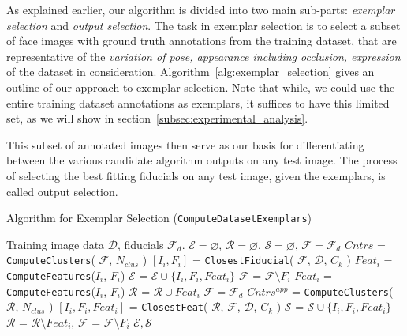 \label{subsec:algorithm_outline}
As explained earlier, our algorithm is divided into two main sub-parts: \emph{exemplar selection}
and \emph{output selection}.
The task in exemplar selection 
is to select a subset of face images with ground truth annotations from the training dataset, 
that are representative of the \emph{variation of pose, appearance including occlusion, expression}
\etc of the dataset in consideration. Algorithm~\ref{alg:exemplar_selection} gives an outline
of our approach to exemplar selection. Note that while, we could use the entire training dataset
annotations as exemplars, it suffices to have this limited set, as we will show in
section~\ref{subsec:experimental_analysis}.

This subset of annotated images then serve as our basis for differentiating between
the various candidate algorithm outputs on any test image. The process of selecting 
the best fitting fiducials on any test image, given the exemplars, is called
output selection.

 \begin{algorithm}[!h]
  \caption{Algorithm for Exemplar Selection ({\tt ComputeDatasetExemplars})}
\begin{algorithmic}
  \INPUT Training image data $\mathcal{D}$, fiducials $\mathcal{F}_d$.
  \STATE $\mathcal{E} = \varnothing$, $\mathcal{R} = \varnothing$, $\mathcal{S} = \varnothing$, $\mathcal{F} = \mathcal{F}_d$
  \STATE $Cntrs$ = {\tt ComputeClusters}( $\mathcal{F}$, $N_{clus}$ )
    \STATE $[ I_i, F_i ]$ = {\tt ClosestFiducial}( $\mathcal{F}$, $\mathcal{D}$, $C_k$ )
    \STATE $Feat_i$ = {\tt ComputeFeatures}($I_i$, $F_i$)
    \STATE $\mathcal{E}$ = $\mathcal{E} \cup \{I_i, F_i, Feat_i\}$
    \STATE $\mathcal{F}$ = $\mathcal{F} \setminus F_i$
  \ENDFOR
    \STATE $Feat_i$ = {\tt ComputeFeatures}($I_i$, $F_i$)
    \STATE $\mathcal{R}$ = $\mathcal{R} \cup  Feat_i $
  \ENDFOR
  \STATE $\mathcal{F} = \mathcal{F}_d$
  \STATE $Cntrs^{app}$ = {\tt ComputeClusters}( $\mathcal{R}$, $N_{clus}$ )
    \STATE $[ I_i, F_i, Feat_i ]$ = {\tt ClosestFeat}( $\mathcal{R}$, $\mathcal{F}$, $\mathcal{D}$, $C_k$ )
    \STATE $\mathcal{S}$ = $\mathcal{S} \cup \{ I_i, F_i, Feat_i \}$
    \STATE $\mathcal{R}$ = $\mathcal{R} \setminus Feat_i $, \qquad $\mathcal{F}$ = $\mathcal{F} \setminus F_i $
  \ENDFOR
  \OUTPUT $\mathcal{E}, \mathcal{S}$
\end{algorithmic}
\label{alg:exemplar_selection}
\end{algorithm}

